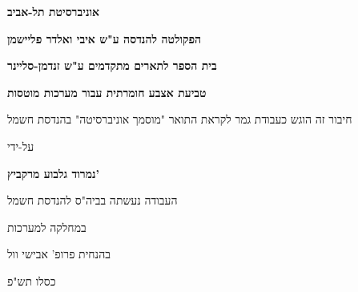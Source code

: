 \begin{otherlanguage}{hebrew}
\begin{center}
\begin{davidfont}
  \vspace*{1cm}
  
  \large
  \textbf{אוניברסיטת תל-אביב}
  
  \footnotesize
  \textbf{הפקולטה להנדסה ע"ש איבי ואלדר פליישמן}
   
  \textbf{בית הספר לתארים מתקדמים ע"ש זנדמן-סליינר}
   
  \vspace{1.2cm}
  \LARGE
  \textbf{טביעת אצבע חומרתית עבור מערכות מוטסות}
  
  \vspace{0.5cm}
   
  \vspace{1cm}
  \normalsize
  חיבור זה הוגש כעבודת גמר לקראת התואר "מוסמך אוניברסיטה" בהנדסת חשמל
   
  \vspace{0.5cm}
  על-ידי
   
  \Large
  \textbf{נמרוד גלבוע מרקביץ'}
   
  \vspace{1 cm}
  \normalsize
  העבודה נעשתה בביה"ס להנדסת חשמל
  
  במחלקה למערכות
   
  \vspace{0.5cm}
  
  בהנחית פרופ' אבישי וול
   
  \vspace{0.5cm}
  \large
  כסלו תש"פ
\end{davidfont}
\end{center}
\end{otherlanguage}
